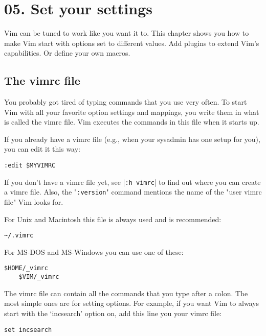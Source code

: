 \section{05. Set your settings}
Vim can be tuned to work like you want it to.  This chapter shows you how to
make Vim start with options set to different values.  Add plugins to extend
Vim's capabilities.  Or define your own macros.
\subsection{The vimrc file}
\label{The vimrc file}
\label{vimrc-intro}

You probably got tired of typing commands that you use very often.
To start Vim with all your favorite option settings and mappings, you write them in what is called the vimrc file.
Vim executes the commands in this file when it starts up.

If you already have a vimrc file (e.g., when your sysadmin has one setup for you), you can edit it this way:

 \begin{Verbatim}[samepage=true]
 :edit $MYVIMRC
 \end{Verbatim}

If you don't have a vimrc file yet, see |\texttt{:h vimrc}| to find out where you can create a vimrc file.
Also, the "\texttt{:version}" command mentions the name of the "user vimrc file" Vim looks for.

For Unix and Macintosh this file is always used and is recommended:

\begin{Verbatim}[samepage=true]
    ~/.vimrc 
\end{Verbatim}

For MS-DOS and MS-Windows you can use one of these:

\begin{Verbatim}[samepage=true]
    $HOME/_vimrc 
    $VIM/_vimrc 
\end{Verbatim}

The vimrc file can contain all the commands that you type after a colon.
The most simple ones are for setting options.
For example, if you want Vim to always start with the `incsearch' option on, add this line you your vimrc file:

 \begin{Verbatim}[samepage=true]
 set incsearch
 \end{Verbatim}


